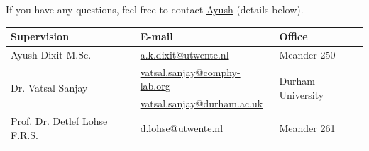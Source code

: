 \documentclass[a4paper,10pt]{article}
\begin{document}
If you have any questions, feel free to contact \href{mailto:a.k.dixit@utwente.nl}{Ayush} (details below).
\begin{center}
\begin{tabular}{|l|l|l|}
\hline \textbf{Supervision} & \textbf{E-mail} & \textbf{Office} \\
\hline Ayush Dixit M.Sc. & \href{mailto:a.k.dixit@utwente.nl}{a.k.dixit@utwente.nl} & Meander 250 \\
\hline \multirow{2}{*}{Dr. Vatsal Sanjay} & \href{mailto:vatsal.sanjay@comphy-lab.org}{vatsal.sanjay@comphy-lab.org} & \multirow{2}{*}{Durham University} \\
& \href{mailto:vatsal.sanjay@durham.ac.uk}{vatsal.sanjay@durham.ac.uk} & \\
\hline Prof. Dr. Detlef Lohse F.R.S. & \href{mailto:d.lohse@utwente.nl}{d.lohse@utwente.nl} & Meander 261  \\
\hline
\end{tabular}
\end{center}

\printbibliography
\end{document}
